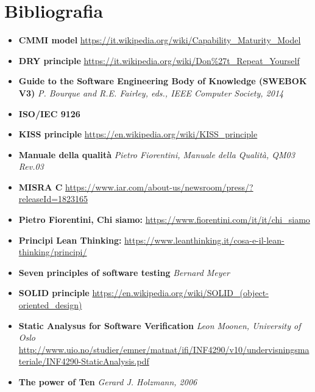 \chapter*{Bibliografia}

\begin{itemize}[wide=0pt, leftmargin=*]
 
\item[] \textbf{CMMI model} \url{https://it.wikipedia.org/wiki/Capability_Maturity_Model}

\item[] \textbf{DRY principle} \url{https://it.wikipedia.org/wiki/Don\%27t_Repeat_Yourself}

\item[] \textbf{Guide to the Software Engineering Body of Knowledge (SWEBOK V3)} \textit{P. Bourque and R.E. Fairley, eds., IEEE Computer Society, 2014}

\item[] \textbf{ISO/IEC 9126}

\item[] \textbf{KISS principle} \url{https://en.wikipedia.org/wiki/KISS_principle}

\item[] \textbf{Manuale della qualità}
\textit{Pietro Fiorentini, Manuale della Qualità, QM03 Rev.03}

\item[] \textbf{MISRA C} \url{https://www.iar.com/about-us/newsroom/press/?releaseId=1823165}

\item[] \textbf{Pietro Fiorentini, Chi siamo: }  \url{https://www.fiorentini.com/it/it/chi_siamo}

\item[] \textbf{Principi Lean Thinking: } \url{https://www.leanthinking.it/cosa-e-il-lean-thinking/principi/}

\item[] \textbf{Seven principles of software testing} \textit{Bernard Meyer}

\item[] \textbf{SOLID principle} \url{https://en.wikipedia.org/wiki/SOLID_(object-oriented_design)}

\item[] \textbf{Static Analysus for Software Verification} \textit{Leon Moonen, University of Oslo} \url{http://www.uio.no/studier/emner/matnat/ifi/INF4290/v10/undervisningsmateriale/INF4290-StaticAnalysis.pdf}

\item[] \textbf{The power of Ten} \textit{Gerard J. Holzmann, 2006}

\end{itemize}


